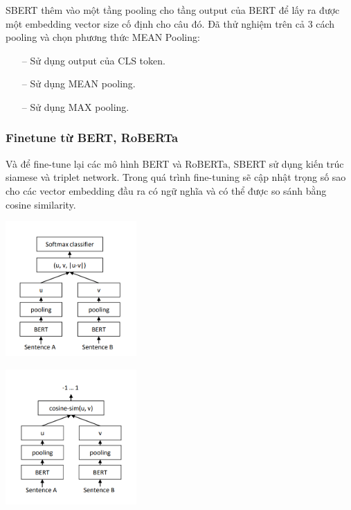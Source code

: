 \documentclass[a4paper, 12pt, openany]{book}
\begin{document}
SBERT thêm vào một tầng pooling cho tầng output của BERT để lấy ra được
một embedding vector size cố định cho câu đó. Đã thử nghiệm trên cả 3 cách pooling và chọn phương thức MEAN Pooling:

\begin{itemize}
    \item[--] Sử dụng output của CLS token.
    \item[--] Sử dụng MEAN pooling.
    \item[--] Sử dụng MAX pooling.
\end{itemize}

\subsubsection{Finetune từ BERT, RoBERTa}

Và để fine-tune lại các mô hình BERT và RoBERTa, SBERT sử dụng kiến trúc siamese và triplet network.
Trong quá trình fine-tuning sẽ cập nhật trọng số sao cho các vector embedding đầu ra có ngữ nghĩa và có thể được so sánh bằng cosine similarity.

\begin{multicols}{2}
    \begin{minipage}
        {14cm}
        \captionsetup{type=figure}
        \centering
        \includegraphics[width=5cm]{./assets/images/sbert-softmax.png}
        \label{fig:demo-register-1}
    \end{minipage}

    \begin{minipage}
        {14cm}
        \captionsetup{type=figure}
        \centering
        \includegraphics[width=5cm]{./assets/images/sbert-cosine.png}
        \label{fig:demo-register-2}
    \end{minipage}
\end{multicols}
\end{document}
